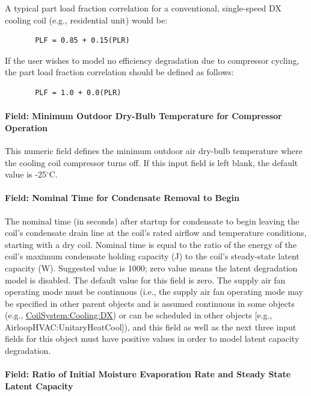 A typical part load fraction correlation for a conventional, single-speed DX cooling coil (e.g., residential unit) would be:

\begin{lstlisting}
       PLF = 0.85 + 0.15(PLR)
\end{lstlisting}

If the user wishes to model no efficiency degradation due to compressor cycling, the part load fraction correlation should be defined as follows:

\begin{lstlisting}
       PLF = 1.0 + 0.0(PLR)
\end{lstlisting}

\paragraph{Field: Minimum Outdoor Dry-Bulb Temperature for Compressor Operation}

This numeric field defines the minimum outdoor air dry-bulb temperature where the cooling coil compressor turns off. If this input field is left blank, the default value is -25$^\circ$C.

\paragraph{Field: Nominal Time for Condensate Removal to Begin}\label{field-nominal-time-for-condensate-removal-to-begin}

The nominal time (in seconds) after startup for condensate to begin leaving the coil's condensate drain line at the coil's rated airflow and temperature conditions, starting with a dry coil. Nominal time is equal to the ratio of the energy of the coil's maximum condensate holding capacity (J) to the coil's steady-state latent capacity (W). Suggested value is 1000; zero value means the latent degradation model is disabled. The default value for this field is zero. The supply air fan operating mode must be continuous (i.e., the supply air fan operating mode may be specified in other parent objects and is assumed continuous in some objects (e.g., \hyperref[coilsystemcoolingdx]{CoilSystem:Cooling:DX}) or can be scheduled in other objects {[}e.g., AirloopHVAC:UnitaryHeatCool{]}), and this field as well as the next three input fields for this object must have positive values in order to model latent capacity degradation.

\paragraph{Field: Ratio of Initial Moisture Evaporation Rate and Steady State Latent Capacity}\label{field-ratio-of-initial-moisture-evaporation-rate-and-steady-state-latent-capacity}

